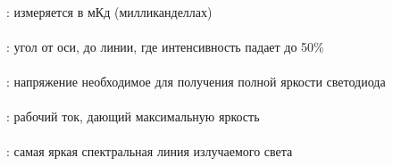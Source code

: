 
\paragraph{}: измеряется в мКд
(милликанделлах)

\paragraph{}: угол от оси, до линии, где
интенсивность падает до 50\%

\paragraph{}:
напряжение необходимое для получения полной яркости светодиода

\paragraph{}: рабочий ток, дающий
максимальную яркость

\paragraph{}: самая яркая
спектральная линия излучаемого света
